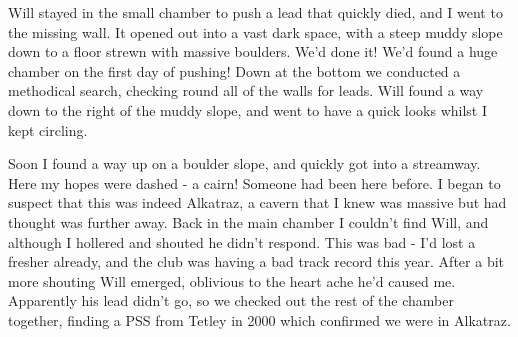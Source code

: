 Will stayed in the small chamber to push a lead that quickly died, and I went to the missing wall. It opened out into a vast dark space, with a steep muddy slope down to a floor strewn with massive boulders. We’d done it! We’d found a huge chamber on the first day of pushing! Down at the bottom we conducted a methodical search, checking round all of the walls for leads. Will found a way down to the right of the muddy slope, and went to have a quick looks whilst I kept circling.

\begin{figure}[t!]
	\checkoddpage \ifoddpage \forcerectofloat \else \forceversofloat \fi
	\centering
	
   	\begin{subfigure}[t]{0.49\textwidth}
    	\centering
       	\caption{} \label{The spiral climb}
    \end{subfigure}
    \hfill
	\begin{subfigure}[t]{0.49\textwidth}
		\centering
		 \caption{}\label{Alkatraz}
	\end{subfigure}
    \vspace{0cm}
	
	\begin{subfigure}[h]{\textwidth}
		\centering
		\caption{}\label{WS bolting}
	\end{subfigure}

\end{figure}

Soon I found a way up on a boulder slope, and quickly got into a streamway. Here my hopes were dashed - a cairn! Someone had been here before. I began to suspect that this was indeed Alkatraz, a cavern that I knew was massive but had thought was further away. Back in the main chamber I couldn’t find Will, and although I hollered and shouted he didn’t respond. This was bad - I’d lost a fresher already, and the club was having a bad track record this year. After a bit more shouting Will emerged, oblivious to the heart ache he’d caused me. Apparently his lead didn’t go, so we checked out the rest of the chamber together, finding a PSS from Tetley in 2000 which confirmed we were in Alkatraz.

